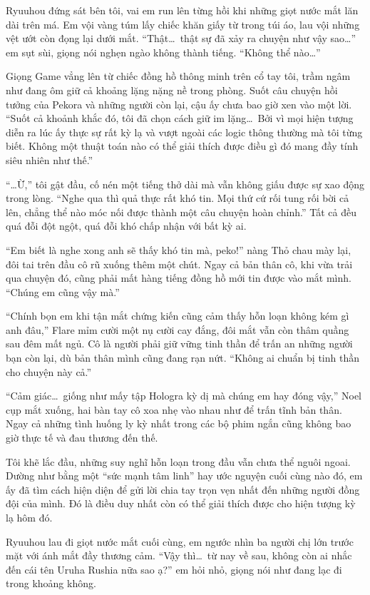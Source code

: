 \documentclass[../main.tex]{subfiles}
\begin{document}
Ryuuhou đứng sát bên tôi, vai em run lên từng hồi khi những giọt nước mắt lăn dài trên má. Em vội vàng túm lấy chiếc khăn giấy từ trong túi áo, lau vội những vệt ướt còn đọng lại dưới mắt. ``Thật\dots\ thật sự đã xảy ra chuyện như vậy sao\dots'' em sụt sùi, giọng nói nghẹn ngào không thành tiếng. ``Không thể nào\dots''

Giọng Game vẳng lên từ chiếc đồng hồ thông minh trên cổ tay tôi, trầm ngâm như đang ôm giữ cả khoảng lặng nặng nề trong phòng. Suốt câu chuyện hồi tưởng của Pekora và những người còn lại, cậu ấy chưa bao giờ xen vào một lời. ``Suốt cả khoảnh khắc đó, tôi đã chọn cách giữ im lặng\dots\ Bởi vì mọi hiện tượng diễn ra lúc ấy thực sự rất kỳ lạ và vượt ngoài các logic thông thường mà tôi từng biết. Không một thuật toán nào có thể giải thích được điều gì đó mang đầy tính siêu nhiên như thế.''

``\dots Ừ,'' tôi gật đầu, cố nén một tiếng thở dài mà vẫn không giấu được sự xao động trong lòng. ``Nghe qua thì quả thực rất khó tin. Mọi thứ cứ rối tung rối bời cả lên, chẳng thể nào móc nối được thành một câu chuyện hoàn chỉnh.'' Tất cả đều quá đỗi đột ngột, quá đỗi khó chấp nhận với bất kỳ ai.

``Em biết là nghe xong anh sẽ thấy khó tin mà, peko!'' nàng Thỏ chau mày lại, đôi tai trên đầu cô rũ xuống thêm một chút. Ngay cả bản thân cô, khi vừa trải qua chuyện đó, cũng phải mất hàng tiếng đồng hồ mới tin được vào mắt mình. ``Chúng em cũng vậy mà.''

``Chính bọn em khi tận mắt chứng kiến cũng cảm thấy hỗn loạn không kém gì anh đâu,'' Flare mỉm cười một nụ cười cay đắng, đôi mắt vẫn còn thâm quầng sau đêm mất ngủ. Cô là người phải giữ vững tinh thần để trấn an những người bạn còn lại, dù bản thân mình cũng đang rạn nứt. ``Không ai chuẩn bị tinh thần cho chuyện này cả.''

``Cảm giác\dots\ giống như mấy tập Hologra kỳ dị mà chúng em hay đóng vậy,'' Noel cụp mắt xuống, hai bàn tay cô xoa nhẹ vào nhau như để trấn tĩnh bản thân. Ngay cả những tình huống ly kỳ nhất trong các bộ phim ngắn cũng không bao giờ thực tế và đau thương đến thế.

Tôi khẽ lắc đầu, những suy nghĩ hỗn loạn trong đầu vẫn chưa thể nguôi ngoai. Dường như bằng một ``sức mạnh tâm linh'' hay ước nguyện cuối cùng nào đó, em ấy đã tìm cách hiện diện để gửi lời chia tay trọn vẹn nhất đến những người đồng đội của mình. Đó là điều duy nhất còn có thể giải thích được cho hiện tượng kỳ lạ hôm đó.

Ryuuhou lau đi giọt nước mắt cuối cùng, em ngước nhìn ba người chị lớn trước mặt với ánh mắt đầy thương cảm. ``Vậy thì\dots\ từ nay về sau, không còn ai nhắc đến cái tên Uruha Rushia nữa sao ạ?'' em hỏi nhỏ, giọng nói như đang lạc đi trong khoảng không.
\end{document}
